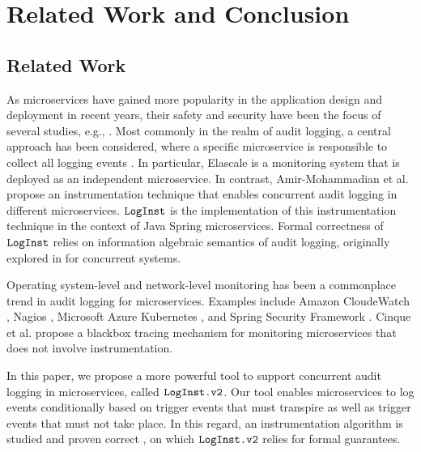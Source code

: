 \section{Related Work and Conclusion} \label{sec:rwc}

\subsection{Related Work} \label{sec:relwork}

As microservices have gained more popularity in the application design and deployment in recent years, their safety and security have been the focus of several studies, e.g., \cite{mateus2021security, nkomo2019software, nehme2019securing, yu2019survey}. Most commonly in the realm of audit logging, a central approach has been considered, where a specific microservice is responsible to collect all logging events \cite{barabanov2021security, kazanavivcius2019migrating}. In particular, Elascale \cite{khazaei2017elascale} is a monitoring system that is deployed as an independent microservice. In contrast, Amir-Mohammadian et al. \cite{stpsa21} propose an instrumentation technique that enables concurrent audit logging in different microservices. $\texttt{LogInst}$ \cite{github1} is the implementation of this instrumentation technique in the context of Java Spring microservices. Formal correctness of $\texttt{LogInst}$ relies on information algebraic \cite{Kohlas14} semantics of audit logging, originally explored in \cite{lsfa20}  for concurrent systems. 

Operating system-level and network-level monitoring  has been a commonplace trend in audit logging for microservices. Examples include Amazon CloudeWatch \cite{cloudwatch}, Nagios \cite{nagios}, Microsoft Azure Kubernetes \cite{kuber}, and Spring Security Framework \cite{nguyen2019applying}. Cinque et al. \cite{cinque2019microservices} propose a blackbox tracing mechanism for monitoring microservices that does not involve instrumentation. 

In this paper, we propose a more powerful tool to support concurrent audit logging in microservices, called $\texttt{LogInst.v2}$. Our tool enables microservices to log events conditionally based on trigger events that must transpire as well as trigger events that must not take place. In this regard, an instrumentation algorithm is studied and proven correct \cite{amirmoh-tr21}, on which $\texttt{LogInst.v2}$ relies for formal guarantees. 

